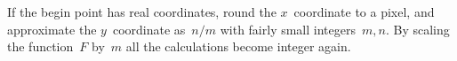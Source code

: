 If the begin point has real coordinates, round the $x$~coordinate to a
pixel, and approximate the $y$~coordinate as~$n/m$ with fairly small
integers~$m,n$. By scaling the function~$F$ by~$m$ all the
calculations become integer again.
